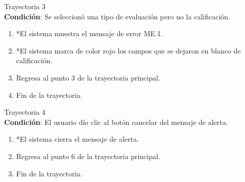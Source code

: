 \large{Trayectoria 3}\\
\textbf{Condición}: Se seleccionó una tipo de evaluación pero no la calificación.
\begin{enumerate}
\item *El sistema muestra el mensaje de error ME.1.
\item *El sistema marca de color rojo los campos que se dejaron en blanco de calificación.
\item Regresa al punto 3 de la trayectoria principal.
\item Fin de la trayectoria.
\end{enumerate}
\large{Trayectoria 4}\\
\textbf{Condición}: El usuario dío clic al botón cancelar del mensaje de alerta.
\begin{enumerate}
\item *El sistema cierra el mensaje de alerta.
\item Regresa al punto 6 de la trayectoria principal.
\item Fin de la trayectoria.
\end{enumerate}